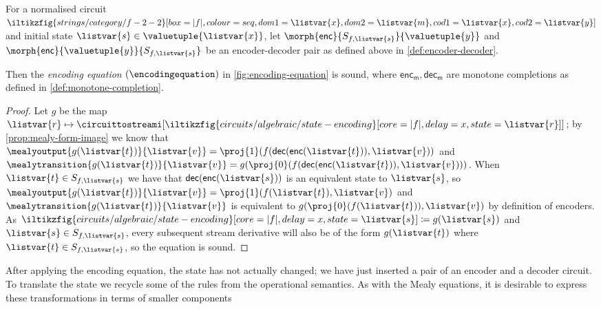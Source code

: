 \begin{proposition}\label{prop:encoding-equation}
    For a normalised circuit \(
    \iltikzfig{strings/category/f-2-2}[box=|f|,colour=seq,dom1=\listvar{x},dom2=\listvar{m},cod1=\listvar{x},cod2=\listvar{y}]
    \) and initial state \(\listvar{s} \in \valuetuple{\listvar{x}}\), let
    \(\morph{\mathsf{enc}}{S_{f,\listvar{s}}}{\valuetuple{y}}\) and
    \(\morph{\mathsf{enc}}{\valuetuple{y}}{S_{f, \listvar{s}}}\) be an
    encoder-decoder pair as defined above in \cref{def:encoder-decoder}.

    Then the \emph{encoding equation} \((\encodingequation)\) in
    \cref{fig:encoding-equation} is sound, where
    \(\mathsf{enc}_\mathsf{m},\mathsf{dec}_\mathsf{m}\) are monotone completions
    as defined in \cref{def:monotone-completion}.
\end{proposition}
\begin{proof}
    Let \(g\) be the map \(\listvar{r} \mapsto
    \circuittostreami[\iltikzfig{circuits/algebraic/state-encoding}[core=|f|,delay=x,state=\listvar{r}]]
    \); by \cref{prop:mealy-form-image} we know that \(
    \mealyoutput{g(\listvar{t})}{\listvar{v}}
    =
    \proj{1}(f(\mathsf{dec}(\mathsf{enc}(\listvar{t})), \listvar{v}))
    \) and \(
    \mealytransition{g(\listvar{t})}{\listvar{v}}
    =
    g(\proj{0}(f(\mathsf{dec}(\mathsf{enc}(\listvar{t})), \listvar{v})))
    \).
    When \(\listvar{t} \in S_{f, \listvar{s}}\) we have that \(
    \mathsf{dec}(\mathsf{enc}(\listvar{s}))\) is an equivalent state to
    \(\listvar{s}\),
    so
    \(
    \mealyoutput{g(\listvar{t})}{\listvar{v}}
    =
    \proj{1}(f(\listvar{t}), \listvar{v})
    \) and \(
    \mealytransition{g(\listvar{t})}{\listvar{v}}
    \) is equivalent to \(
    g(\proj{0}(f(\listvar{t})), \listvar{v})
    \) by definition of encoders.
    As \(
    \iltikzfig{circuits/algebraic/state-encoding}[core=|f|,delay=x,state=\listvar{s}]
    \coloneqq
    g(\listvar{s})
    \) and \(\listvar{s} \in S_{f,\listvar{s}}\),
    every subsequent stream derivative will also be of the form
    \(g(\listvar{t})\) where \(\listvar{t} \in S_{f,\listvar{s}}\), so the
    equation is sound.
\end{proof}

After applying the encoding equation, the state has not actually changed; we
have just inserted a pair of an encoder and a decoder circuit.
To translate the state we recycle some of the rules from the operational
semantics.
As with the Mealy equations, it is desirable to express these transformations in
terms of smaller components

